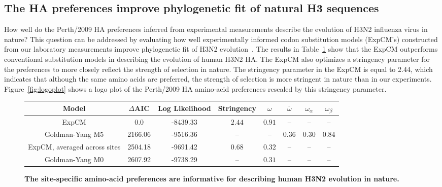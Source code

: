 \documentclass[9pt,twocolumn,twoside]{pnas-new}
\begin{document}
\subsection*{The HA preferences improve phylogenetic fit of natural H3 sequences}
How well do the Perth/2009 HA preferences inferred from experimental measurements describe the evolution of H3N2 influenza virus in nature?
This question can be addressed by evaluating how well experimentally informed codon substitution models (ExpCM's) constructed from our laboratory measurements improve phylogenetic fit of H3N2 evolution~\cite{hilton2017phydms}.
The results in Table~\ref{tab:phydms} show that the ExpCM outperforms conventional substitution models in describing the evolution of human H3N2 HA. 
The ExpCM also optimizes a stringency parameter for the preferences to more closely reflect the strength of selection in nature.
The stringency parameter in the ExpCM is equal to 2.44, which indicates that although the same amino acids are preferred, the strength of selection is more stringent in nature than in our experiments.
Figure~\ref{fig:logoplot} shows a logo plot of the Perth/2009 HA amino-acid preferences rescaled by this stringency parameter.

\begin{figure}
\centering
\caption{\label{tab:phydms}
{\bf The site-specific amino-acid preferences are informative for describing human H3N2 evolution in nature.}}
\begin{tabular}{cccccccc}
\hline
\bf{Model} & \bf{$\Delta$AIC} & \bf{Log Likelihood} & \bf{Stringency} & \bf{$\omega$} & \bf{$\overline{\omega}$} & \bf{$\omega_{\alpha}$} & \bf{$\omega_{\beta}$} \\ \hline
ExpCM & 0.0 & -8439.33 & $2.44$ & $0.91$ & -- & -- & -- \\
Goldman-Yang M5 & 2166.06 & -9516.36 & -- & -- & $0.36$ & $0.30$ & $0.84$ \\
ExpCM, averaged across sites & 2504.18 & -9691.42 & $0.68$ & $0.32$ & -- & -- & -- \\
Goldman-Yang M0 & 2607.92 & -9738.29 & -- & $0.31$ & -- & -- & -- \\
\hline
\end{tabular}

\end{figure}
\end{document}
